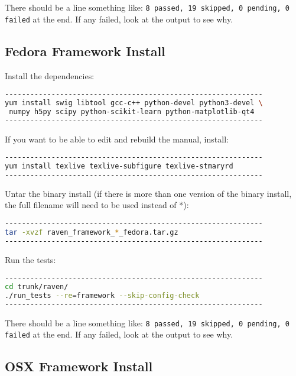 There should be a line something like:
{\tt 8 passed, 19 skipped, 0 pending, 0 failed}
at the end.  If any failed, look at the output to see why.

\subsection{Fedora Framework Install}

Install the dependencies:

\begin{lstlisting}[language=bash]
-------------------------------------------------------------
yum install swig libtool gcc-c++ python-devel python3-devel \
 numpy h5py scipy python-scikit-learn python-matplotlib-qt4
-------------------------------------------------------------
\end{lstlisting}

If you want to be able to edit and rebuild the manual, install:
\begin{lstlisting}[language=bash]
-------------------------------------------------------------
yum install texlive texlive-subfigure texlive-stmaryrd
-------------------------------------------------------------
\end{lstlisting}

Untar the binary install (if there is more than one version of the
binary install, the full filename will need to be used instead of *):

\begin{lstlisting}[language=bash]
-------------------------------------------------------------
tar -xvzf raven_framework_*_fedora.tar.gz
-------------------------------------------------------------
\end{lstlisting}

Run the tests:

\begin{lstlisting}[language=bash]
-------------------------------------------------------------
cd trunk/raven/
./run_tests --re=framework --skip-config-check
-------------------------------------------------------------
\end{lstlisting}

There should be a line something like:
{\tt 8 passed, 19 skipped, 0 pending, 0 failed}
at the end.  If any failed, look at the output to see why.

\subsection{OSX Framework Install}

